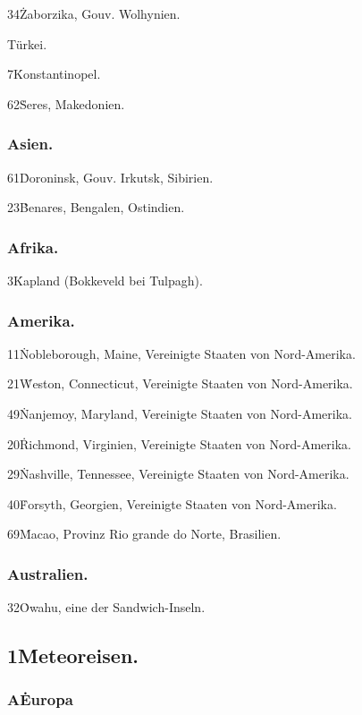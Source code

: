 \documentclass[a4paper, 11pt, oneside, polutonikogreek, german]{article}
\begin{document}
34\. Zaborzika, Gouv. Wolhynien.

Türkei.

7\. Konstantinopel.

62\. Seres, Makedonien.

\subsubsection{Asien.}

61\. Doroninsk, Gouv. Irkutsk, Sibirien.

23\. Benares, Bengalen, Ostindien.

\subsubsection{Afrika.}

3\. Kapland (Bokkeveld bei Tulpagh).

\subsubsection{Amerika.}

11\. Nobleborough, Maine, Vereinigte Staaten von Nord-Amerika.

21\. Weston, Connecticut, Vereinigte Staaten von Nord-Amerika.

49\. Nanjemoy, Maryland, Vereinigte Staaten von Nord-Amerika.

20\. Richmond, Virginien, Vereinigte Staaten von Nord-Amerika.

29\. Nashville, Tennessee, Vereinigte Staaten von Nord-Amerika.

40\. Forsyth, Georgien, Vereinigte Staaten von Nord-Amerika.

69\. Macao, Provinz Rio grande do Norte, Brasilien.

\subsubsection{Australien.}

32\. Owahu, eine der Sandwich-Inseln.

\subsection{1\. Meteoreisen.}

\subsubsection{A\. Europa}
\end{document}
